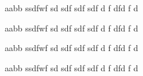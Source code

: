 

\begin{exercice}[
  type=fun,
  difficulty=vhard]{aa}{bb}
  ssdfwf sd sdf sdf sdf d f dfd f d
\end{exercice}
\begin{exercice}[
  type=training,
  difficulty=easy]{aa}{bb}
  ssdfwf sd sdf sdf sdf d f dfd f d
\end{exercice}
\begin{exercice}[
  type=fun,
  difficulty=hard]{aa}{bb}
  ssdfwf sd sdf sdf sdf d f dfd f d
\end{exercice}
\begin{exercice}[
  type=fun,
  source/name=ccp,
  source/year=1998,
  difficulty=vhard]{aa}{bb}
  ssdfwf sd sdf sdf sdf d f dfd f d
\end{exercice}

